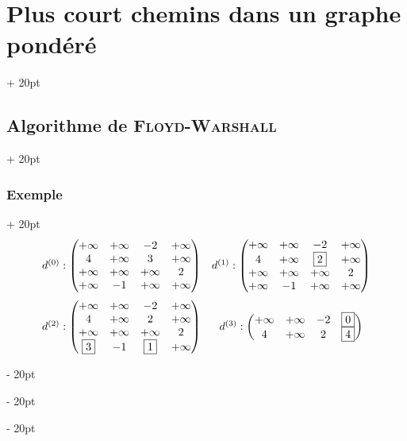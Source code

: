 \documentclass[a4paper, 12pt, twoside]{article}
\newcommand{\ind}[1][20pt]{\advance\leftskip + #1}
\newcommand{\deind}[1][20pt]{\advance\leftskip - #1}
\newenvironment{indt}[2][20pt]{#2 \par \ind[#1]}{\par \deind} %
\begin{document}
\begin{indt}{\section{Plus court chemins dans un graphe pondéré}}
\begin{indt}{\subsection{Algorithme de \textsc{Floyd-Warshall}}}
\begin{indt}{\subsubsection{Exemple}}
                \[
                    \begin{array}{cc}
                        d^{(0)} :
                        \begin{pmatrix}
                            +\infty & +\infty & -2 & +\infty
                            \\
                            4 & +\infty & 3 & +\infty
                            \\
                            +\infty & +\infty & +\infty & 2
                            \\
                            +\infty & -1 & +\infty & +\infty
                        \end{pmatrix}
                        &
                        d^{(1)} :
                        \begin{pmatrix}
                            +\infty & +\infty & -2 & +\infty
                            \\
                            4 & +\infty & \boxed{2} & +\infty
                            \\
                            +\infty & +\infty & +\infty & 2
                            \\
                            +\infty & -1 & +\infty & +\infty
                        \end{pmatrix}
                        \vspace{6pt}
                        \\
                        d^{(2)} :
                        \begin{pmatrix}
                            +\infty & +\infty & -2 & +\infty
                            \\
                            4 & +\infty & 2 & +\infty
                            \\
                            +\infty & +\infty & +\infty & 2
                            \\
                            \boxed{3} & -1 & \boxed{1} & +\infty
                        \end{pmatrix}
                        &
                        d^{(3)} :
                        \begin{pmatrix}
                            +\infty & +\infty & -2 & \boxed 0
                            \\
                            4 & +\infty & 2 & \boxed 4
                            \\

\end{pmatrix}
\end{array}\]
\end{indt}
\end{indt}
\end{indt}
\end{document}
